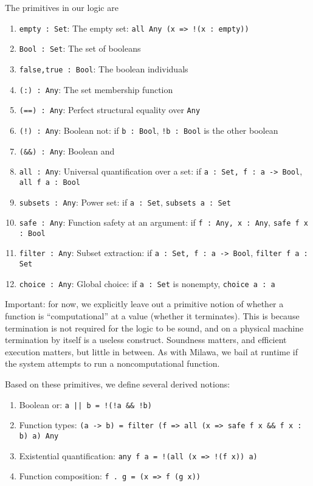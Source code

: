 \documentclass[11pt]{article}
\newcommand{\cc}[1]{\texttt{#1}}
\begin{document}
The primitives in our logic are

\begin{enumerate}
\item \cc{empty : Set}: The empty set: \cc{all Any (x => !(x : empty))}
\item \cc{Bool : Set}: The set of booleans
\item \cc{false,true : Bool}: The boolean individuals
\item \cc{(:) : Any}: The set membership function
\item \cc{(==) : Any}: Perfect structural equality over \cc{Any}
\item \cc{(!) : Any}: Boolean not: if \cc{b : Bool}, \cc{!b : Bool} is the other boolean
\item \cc{(\&\&) : Any}: Boolean and
\item \cc{all : Any}: Universal quantification over a set: if \cc{a : Set, f : a -> Bool}, \cc{all f a : Bool}
\item \cc{subsets : Any}: Power set: if \cc{a : Set}, \cc{subsets a : Set}
\item \cc{safe : Any}: Function safety at an argument: if \cc{f : Any, x : Any}, \cc{safe f x : Bool}
\item \cc{filter : Any}: Subset extraction: if \cc{a : Set, f : a -> Bool}, \cc{filter f a : Set}
\item \cc{choice : Any}: Global choice: if \cc{a : Set} is nonempty, \cc{choice a : a}
\end{enumerate}

Important: for now, we explicitly leave out a primitive notion of whether a function is ``computational''
at a value (whether it terminates).  This is because termination is not required for the logic to be
sound, and on a physical machine termination by itself is a useless construct.  Soundness matters, and
efficient execution matters, but little in between.  As with Milawa, we bail at runtime
if the system attempts to run a noncomputational function.

Based on these primitives, we define several derived notions:

\begin{enumerate}
\item Boolean or: \cc{a || b = !(!a \&\& !b)}
\item Function types: \cc{(a -> b) = filter (f => all (x => safe f x \&\& f x : b) a) Any}
\item Existential quantification: \cc{any f a = !(all (x => !(f x)) a)}
\item Function composition: \cc{f . g = (x => f (g x))}
\end{enumerate}
\end{document}
